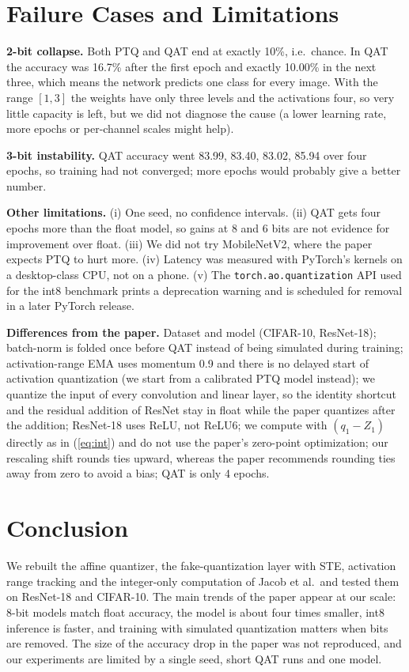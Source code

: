 \documentclass[conference]{IEEEtran}
\begin{document}
\section{Failure Cases and Limitations}
\textbf{2-bit collapse.} Both PTQ and QAT end at exactly 10\%, i.e.\ chance. In QAT the accuracy was 16.7\% after the first epoch and exactly 10.00\% in the next three, which means the network predicts one class for every image. With the range $[1,3]$ the weights have only three levels and the activations four, so very little capacity is left, but we did not diagnose the cause (a lower learning rate, more epochs or per-channel scales might help).

\textbf{3-bit instability.} QAT accuracy went 83.99, 83.40, 83.02, 85.94 over four epochs, so training had not converged; more epochs would probably give a better number.

\textbf{Other limitations.} (i) One seed, no confidence intervals. (ii) QAT gets four epochs more than the float model, so gains at 8 and 6 bits are not evidence for improvement over float. (iii) We did not try MobileNetV2, where the paper expects PTQ to hurt more. (iv) Latency was measured with PyTorch's kernels on a desktop-class CPU, not on a phone. (v) The \texttt{torch.ao.quantization} API used for the int8 benchmark prints a deprecation warning and is scheduled for removal in a later PyTorch release.

\textbf{Differences from the paper.} Dataset and model (CIFAR-10, ResNet-18); batch-norm is folded once before QAT instead of being simulated during training; activation-range EMA uses momentum 0.9 and there is no delayed start of activation quantization (we start from a calibrated PTQ model instead); we quantize the input of every convolution and linear layer, so the identity shortcut and the residual addition of ResNet stay in float while the paper quantizes after the addition; ResNet-18 uses ReLU, not ReLU6; we compute with $(q_1-Z_1)$ directly as in (\ref{eq:int}) and do not use the paper's zero-point optimization; our rescaling shift rounds ties upward, whereas the paper recommends rounding ties away from zero to avoid a bias; QAT is only 4 epochs.

\section{Conclusion}
We rebuilt the affine quantizer, the fake-quantization layer with STE, activation range tracking and the integer-only computation of Jacob et al.\ and tested them on ResNet-18 and CIFAR-10. The main trends of the paper appear at our scale: 8-bit models match float accuracy, the model is about four times smaller, int8 inference is faster, and training with simulated quantization matters when bits are removed. The size of the accuracy drop in the paper was not reproduced, and our experiments are limited by a single seed, short QAT runs and one model.
\end{document}
